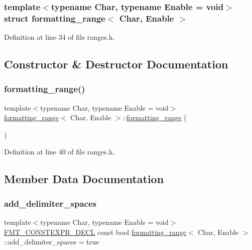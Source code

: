 \subsubsection*{template$<$typename Char, typename Enable = void$>$\newline
struct formatting\+\_\+range$<$ Char, Enable $>$}



Definition at line 34 of file ranges.\+h.



\subsection{Constructor \& Destructor Documentation}
\mbox{\label{structformatting__range_a9a2ebe150fd492aba1eddb30cea71be7}} 
\subsubsection{\texorpdfstring{formatting\+\_\+range()}{formatting\_range()}}
{\footnotesize\ttfamily template$<$typename Char, typename Enable = void$>$ \\
\hyperlink{structformatting__range}{formatting\+\_\+range}$<$ Char, Enable $>$\+::\hyperlink{structformatting__range}{formatting\+\_\+range} (\begin{DoxyParamCaption}{ }\end{DoxyParamCaption})\hspace{0.3cm}{\ttfamily [inline]}}



Definition at line 40 of file ranges.\+h.



\subsection{Member Data Documentation}
\mbox{\label{structformatting__range_ad007def7b6d911c6076864fc79f5fa54}} 
\subsubsection{\texorpdfstring{add\+\_\+delimiter\+\_\+spaces}{add\_delimiter\_spaces}}
{\footnotesize\ttfamily template$<$typename Char, typename Enable = void$>$ \\
\hyperlink{core_8h_af4388801466a5994a363d6005616371a}{F\+M\+T\+\_\+\+C\+O\+N\+S\+T\+E\+X\+P\+R\+\_\+\+D\+E\+CL} const bool \hyperlink{structformatting__range}{formatting\+\_\+range}$<$ Char, Enable $>$\+::add\+\_\+delimiter\+\_\+spaces = true\hspace{0.3cm}{\ttfamily [static]}}



